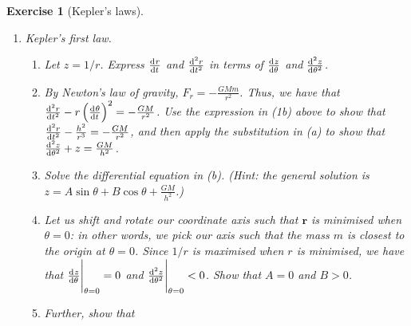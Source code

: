 \documentclass[a4paper,leqno,10pt]{article}
\theoremstyle{exercise}
\newtheorem{Exercise}{Exercise}
\newenvironment{exercise}
  {\begin{mdframed}\begin{Exercise}}
  {\end{Exercise}\end{mdframed}}
\theoremstyle{plain}
\theoremstyle{definition}
\theoremstyle{remark}
\newcommand{\df}{\textbf}
\renewcommand\vec{\mathbf}
\begin{document}
\begin{exercise}[Kepler's laws]
\begin{enumerate}
\begin{enumerate}
              Our force of gravity is a \df{central force}: it only acts in the direction of $ \vec{r} $. Hence the $ \theta$-component
              of the force acting on the mass $ m $ is zero. Show that
              \begin{displaymath}
                r^2 \od{\theta}{t} = h
              \end{displaymath}
              for some constant $ h $.
        \item Suppose $ A(t) $ gives the area `swept out' by the radius vector $ \vec{r} $ between some fixed time $ t_0 $
              and the time $ t $. Using the fact that $ \od{A}{\theta} = \frac{r^2}{2} $ (since $ \dif{A} = \pi r^2 \cdot \frac{\dif{\theta}}{2\pi} $),
              show that $ A(t_2) - A(t_1) = \frac{1}{2}h(t_2 - t_1) $. Conclude \df{Kepler's second law}: if $ P $ and $ Q $ are
              planets with associated masses $ m_P $ and $ m_Q $, then over a time $ \Delta t $ the planets will sweep out equal
              area.
      \end{enumerate}
    \item Kepler's first law.
      \begin{enumerate}
        \item Let $ z = 1/r $. Express $ \od{r}{t} $ and $ \od[2]{r}{t} $ in terms of $ \od{z}{\theta} $ and $ \od[2]{z}{\theta} $.
        \item By Newton's law of gravity, $ F_r = -\frac{GMm}{r^2} $. Thus, we have that $ \od[2]{r}{t} - r \left(\od{\theta}{t}\right)^2 = -\frac{GM}{r^2} $.
              Use the expression in (1b) above to show that $ \od[2]{r}{t} - \frac{h^2}{r^3} = -\frac{GM}{r^2} $, and then apply
              the substitution in (a) to show that $ \od[2]{z}{\theta} + z = \frac{GM}{h^2} $.
        \item Solve the differential equation in (b). (Hint: the general solution is $ z = A \sin \theta + B \cos \theta + \frac{GM}{h^2} $.)
        \item Let us shift and rotate our coordinate axis such that $ \vec{r} $ is minimised when $ \theta = 0 $: in other words, we pick
              our axis such that the mass $ m $ is closest to the origin at $ \theta = 0 $. Since $ 1/r $ is maximised when $ r $ is minimised,
              we have that $ \eval{\od{z}{\theta}}_{\theta = 0} = 0 $ and $ \eval{\od[2]{z}{\theta}}_{\theta = 0} < 0 $. Show that $ A = 0 $
              and $ B > 0 $.
        \item Further, show that
              \begin{displaymath}

\end{displaymath}
\end{enumerate}
\end{enumerate}
\end{exercise}
\end{document}
